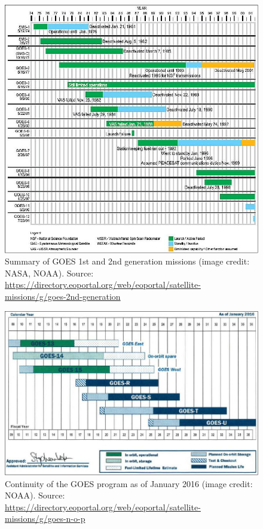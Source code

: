 \documentclass{article}
\begin{document}
\begin{figure}
\centering
\includegraphics[width=\textwidth]{figures/GOES2_AutoB.jpeg}
\caption{Summary of GOES 1st and 2nd generation missions (image credit: NASA, NOAA). Source: \url{https://directory.eoportal.org/web/eoportal/satellite-missions/g/goes-2nd-generation}}
\label{fig:goes2nd}
\end{figure}

\begin{figure}
\centering
\includegraphics[width=\textwidth]{figures/GOES_NOP_Auto10.jpeg}
\caption{
Continuity of the GOES program as of January 2016 (image credit: NOAA). Source: \url{https://directory.eoportal.org/web/eoportal/satellite-missions/g/goes-n-o-p}}
\label{fig:goesnop}
\end{figure}
\end{document}
